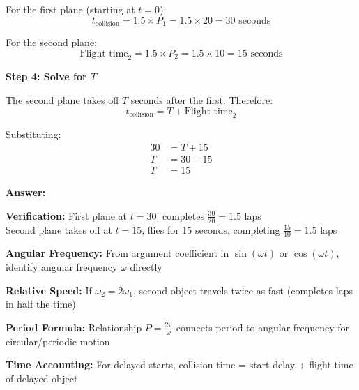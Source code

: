 \begin{solution}
For the first plane (starting at $t=0$):
\[ t_{\text{collision}} = 1.5 \times P_1 = 1.5 \times 20 = 30 \text{ seconds} \]

For the second plane:
\[ \text{Flight time}_2 = 1.5 \times P_2 = 1.5 \times 10 = 15 \text{ seconds} \]

\textbf{Step 4: Solve for $T$}

The second plane takes off $T$ seconds after the first. Therefore:
\[ t_{\text{collision}} = T + \text{Flight time}_2 \]

Substituting:
\begin{align*}
    30 &= T + 15 \\
    T &= 30 - 15 \\
    T &= 15
\end{align*}

\textbf{Answer:} 

\textbf{Verification:} First plane at $t=30$: completes $\frac{30}{20} = 1.5$ laps \checkmark \\
Second plane takes off at $t=15$, flies for 15 seconds, completing $\frac{15}{10} = 1.5$ laps \checkmark
\end{solution}

\begin{takeaways}
\item \textbf{Angular Frequency:} From argument coefficient in $\sin(\omega t)$ or $\cos(\omega t)$, identify angular frequency $\omega$ directly
\item \textbf{Relative Speed:} If $\omega_2 = 2\omega_1$, second object travels twice as fast (completes laps in half the time)
\item \textbf{Period Formula:} Relationship $P = \frac{2\pi}{\omega}$ connects period to angular frequency for circular/periodic motion
\item \textbf{Time Accounting:} For delayed starts, collision time = start delay + flight time of delayed object
\end{takeaways}

\newpage

